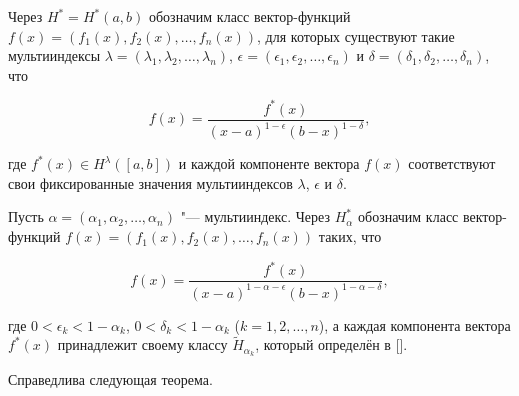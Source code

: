 \begin{definition}[2]Через $H^{*}=H^{*}(a,b)$ обозначим класс вектор-функций $f(x)=(f_1(x),f_2(x), \dots , f_n(x))$, для которых существуют такие мультииндексы $\lambda=(\lambda_1,\lambda_2, \dots , \lambda_n)$, $\epsilon=(\epsilon_1,\epsilon_2, \dots , \epsilon_n)$ и $\delta=(\delta_1,\delta_2, \dots , \delta_n)$, что

$$f(x)=\frac{f^{*}(x)}{(x-a)^{1-\epsilon}(b-x)^{1-\delta}},$$

где $f^{*}(x)\in H^{\lambda}([a,b])$ и каждой компоненте вектора $f(x)$ соответствуют свои фиксированные значения мультииндексов $\lambda$, $\epsilon$ и $\delta$.

\end{definition}



\smallskip



\begin{definition}[3]Пусть $\alpha=(\alpha_1,\alpha_2, \dots , \alpha_n)$ "--- мультииндекс. Через $H^{*}_{\alpha}$ обозначим класс вектор-функций $f(x)=(f_1(x),f_2(x), \dots , f_n(x))$ таких, что

$$f(x)=\frac{f^{*}(x)}{(x-a)^{1-\alpha-\epsilon}(b-x)^{1-\alpha-\delta}},$$

где $0<\epsilon_k<1-\alpha_k$, $0<\delta_k<1-\alpha_k$ ($k=1, 2, \dots , n$), а каждая компонента вектора $f^{*}(x)$ принадлежит своему классу $\tilde{H}_{\alpha_k}$, который определён в [].

\end{definition}



\smallskip



Справедлива следующая теорема.



\smallskip





